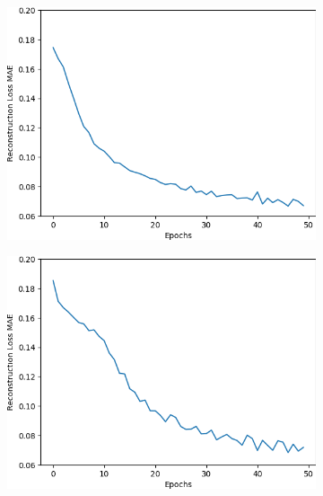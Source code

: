 \begin{figure}[H]
    \centering
    \begin{subfigure}{.25\textwidth}
        \centering
        \includegraphics[width=\textwidth]
        {images/figures/experiments_architecture/mae_graphKernel3maxPool16x16x32_dim1024.png}
        \caption{}
    \end{subfigure}%
    \begin{subfigure}{.25\textwidth}
        \centering
        \includegraphics[width=\textwidth]
        {images/figures/experiments_architecture/mae_graphKernel3maxPool16x16x64_dim1024.png}
        \caption{}
    \end{subfigure}%
    \begin{subfigure}{.25\textwidth}

\end{subfigure}
\end{figure}

